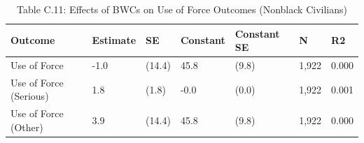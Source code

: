\begin{table}

\caption{Table C.11: Effects of BWCs on Use of Force Outcomes (Nonblack Civilians)}
\centering
\begin{tabular}[t]{lllllll}
\toprule
Outcome & Estimate & SE & Constant & Constant SE & N & R2\\
\midrule
Use of Force & -1.0 & (14.4) & 45.8 & (9.8) & 1,922 & 0.000\\
Use of Force (Serious) & 1.8 & (1.8) & -0.0 & (0.0) & 1,922 & 0.001\\
Use of Force (Other) & 3.9 & (14.4) & 45.8 & (9.8) & 1,922 & 0.000\\
\bottomrule
\end{tabular}
\end{table}
